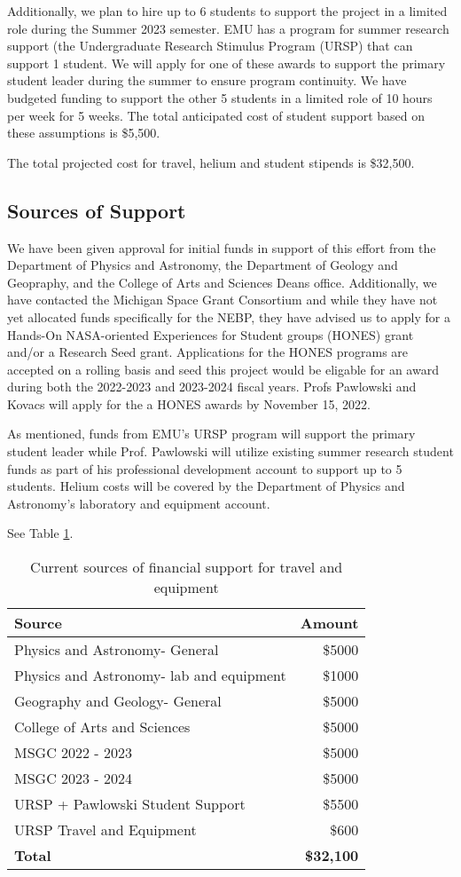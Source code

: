 \documentclass[12pt]{article}
\begin{document}
Additionally, we plan to hire up to 6 students to support the project in a limited role
during the Summer 2023 semester. EMU has a program for summer research
support (the Undergraduate Research Stimulus Program (URSP) that
can support 1 student.
We will apply for one of these awards to support the primary
student leader during the summer to ensure program continuity. We have budgeted
funding to support the other 5 students in a limited role of 10 hours per week
for 5 weeks. The total anticipated cost of student support based on these assumptions is \$5,500.

The total projected cost for travel, helium and student stipends is \$32,500.

\subsection{Sources of Support}

We have been given approval for initial funds in support of this effort
from the Department of Physics and Astronomy, the Department of
Geology and Geopraphy, and the College of Arts and Sciences Deans office.
Additionally, we have contacted the Michigan Space Grant Consortium
and while they have not yet allocated funds specifically for the NEBP, they
have advised us to apply for a Hands-On NASA-oriented Experiences for Student groups
(HONES) grant and/or a Research Seed grant.
Applications for the HONES programs are accepted on a rolling basis and seed
this project would be eligable for an award during both the 2022-2023 and
2023-2024 fiscal years. Profs Pawlowski and Kovacs will apply for
the a HONES awards by November 15, 2022.

As mentioned, funds from EMU's URSP program will support the primary student leader while
Prof. Pawlowski will utilize existing summer research
student funds as part of his professional development account to support up to 5 students.
Helium costs will be covered by the Department of Physics and Astronomy's laboratory
and equipment account.


 See Table \ref{money}.


\begin{table}[h]
\centering
\begin{tabular}{|l|r|}
\hline
Source&Amount\\
\hline
Physics and Astronomy- General&\$5000\\
Physics and Astronomy- lab and equipment&\$1000\\
Geography and Geology- General&\$5000\\
College of Arts and Sciences&\$5000\\
MSGC 2022 - 2023&\$5000\\
MSGC 2023 - 2024&\$5000\\
URSP + Pawlowski Student Support& \$5500\\
URSP Travel and Equipment&\$600\\
\hline
{\bf Total}&{\bf \$32,100}\\
\hline
\end{tabular}
\caption{Current sources of financial support for travel and equipment}
\label{money}
\end{table}
\end{document}
